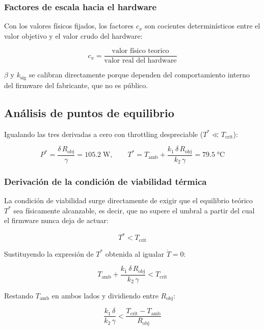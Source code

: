 \documentclass[10pt, twocolumn]{article}
\begin{document}
\subsubsection*{Factores de escala hacia el hardware}
 
Con los valores físicos fijados, los factores $c_x$ son cocientes
determinísticos entre el valor objetivo y el valor crudo del hardware:
 
\[
  c_x = \frac{\text{valor físico teorico}}
             {\text{valor real del hardware}}
\]
 

$\beta$ y $k_\text{sig}$ se calibran directamente porque dependen del
comportamiento interno del firmware del fabricante, que no es público.

\subsection{Análisis de puntos de equilibrio}

Igualando las tres derivadas a cero con throttling despreciable
($T^* \ll T_\text{crit}$):

\begin{equation}
  P^* = \frac{\delta\, R_{\text{obj}}}{\gamma} = 105.2\;\text{W},\qquad
  T^* = T_{\text{amb}} + \frac{k_1\,\delta\, R_{\text{obj}}}{k_2\,\gamma} = 79.5\;\text{°C}
\end{equation}


\subsubsection*{Derivación de la condición de viabilidad térmica}

La condición de viabilidad surge directamente de exigir que el equilibrio
teórico $T^*$ sea físicamente alcanzable, es decir, que no supere el
umbral a partir del cual el firmware nunca deja de actuar:

\begin{equation}
  T^* < T_{\text{crit}}
  \label{eq:viabilidad_req}
\end{equation}

Sustituyendo la expresión de $T^*$ obtenida al igualar $\dot{T}=0$:

\[
  T_{\text{amb}} + \frac{k_1\,\delta\, R_{\text{obj}}}{k_2\,\gamma}
  < T_{\text{crit}}
\]

Restando $T_\text{amb}$ en ambos lados y dividiendo entre $R_\text{obj}$:

\begin{equation}
  \boxed{
    \frac{k_1\,\delta}{k_2\,\gamma}
    < \frac{T_{\text{crit}} - T_{\text{amb}}}{R_{\text{obj}}}
  }
  \label{eq:viabilidad}
\end{equation}
\end{document}
